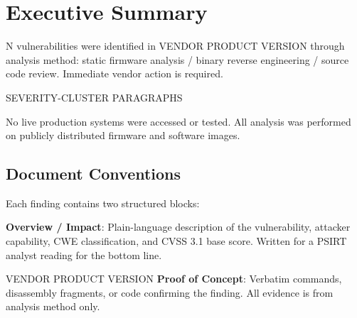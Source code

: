 \documentclass[11pt,a4paper]{article}
\newcommand{\ph}[1]{\lbrack#1\rbrack}
\begin{document}
\newpage

\section{Executive Summary}

%
%

\ph{N} vulnerabilities were identified in \ph{VENDOR} \ph{PRODUCT} \ph{VERSION}
through \ph{analysis method: static firmware analysis / binary reverse
engineering / source code review}. Immediate vendor action is required.


\ph{SEVERITY-CLUSTER PARAGRAPHS}

No live production systems were accessed or tested.
All analysis was performed on publicly distributed firmware and software images.

\subsection{Document Conventions}

Each finding contains two structured blocks:

\begin{overviewbox}
\textbf{Overview / Impact}: Plain-language description of the vulnerability,
attacker capability, CWE classification, and CVSS 3.1 base score.
Written for a PSIRT analyst reading for the bottom line.
\end{overviewbox}

\begin{pocbox}{\ph{VENDOR} \ph{PRODUCT} \ph{VERSION}}
\textbf{Proof of Concept}: Verbatim commands, disassembly fragments, or code
confirming the finding. All evidence is from \ph{analysis method} only.
\end{pocbox}
\end{document}
